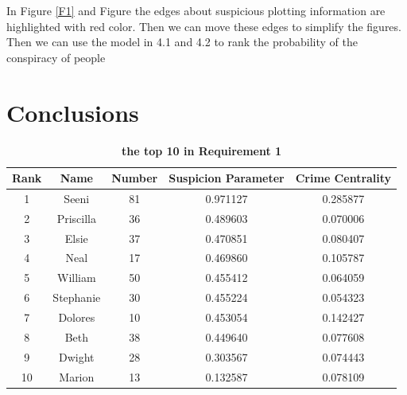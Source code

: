 \documentclass[12pt]{article}
\begin{document}
	In Figure \ref{F1} and Figure the edges about suspicious plotting information are highlighted with red color. Then we can move these edges to simplify the figures. Then we can use the model in 4.1 and 4.2 to rank the probability of the conspiracy of people

\section{Conclusions}

\begin{table}[!htb]
\centering
{}
\begin{tabular}{c|c|c|c|c}
\toprule[2pt] 
\textbf{Rank} & \textbf{Name} & \textbf{Number} & \textbf{Suspicion Parameter} & \textbf{Crime Centrality} \\
\hline
1 & Seeni & 81 & 0.971127 & 0.285877 \\
2 & Priscilla & 36 & 0.489603 & 0.070006 \\
3 & Elsie & 37 & 0.470851 & 0.080407 \\
4 & Neal & 17 & 0.469860 & 0.105787 \\
5 & William & 50 & 0.455412 & 0.064059 \\
6 & Stephanie & 30 & 0.455224 & 0.054323 \\
7 & Dolores & 10 & 0.453054 & 0.142427 \\
8 & Beth & 38 & 0.449640 & 0.077608 \\
9 & Dwight & 28 & 0.303567 & 0.074443 \\
10 & Marion & 13 & 0.132587 & 0.078109 \\
\hline
\end{tabular}
\caption{\textbf{the top 10 in Requirement 1}}
\label{2_7_8}
\end{table}
\end{document}
